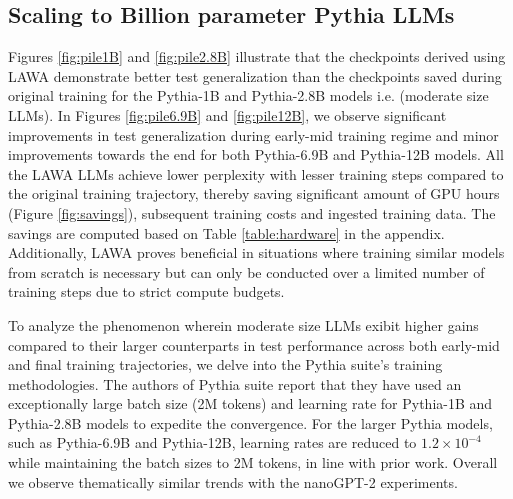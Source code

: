 \documentclass{article}
\newcommand{\method}{LAWA}
\begin{document}
\subsection{Scaling to Billion parameter Pythia LLMs}  \label{sec:result-1}

Figures \ref{fig:pile1B} and \ref{fig:pile2.8B} illustrate that the checkpoints derived using \method{} demonstrate better test generalization than the checkpoints saved during original training for the Pythia-1B and Pythia-2.8B models i.e. (moderate size LLMs). In Figures \ref{fig:pile6.9B} and \ref{fig:pile12B}, we observe significant improvements in test generalization during early-mid training regime and minor improvements towards the end for both Pythia-6.9B and Pythia-12B models. All the LAWA LLMs achieve lower perplexity with lesser training steps compared to the original training trajectory, thereby saving significant amount of GPU hours (Figure \ref{fig:savings}), subsequent training costs and ingested training data. The savings are computed based on Table \ref{table:hardware} in the appendix. Additionally, \method{} proves beneficial in situations where training similar models from scratch is necessary but can only be conducted over a limited number of training steps due to strict compute budgets.

To analyze the phenomenon wherein moderate size LLMs exibit higher gains compared to their larger counterparts in test performance across both early-mid and final training trajectories, we delve into the Pythia suite's training methodologies. The authors of Pythia suite \citep{biderman2023pythia} report that they have used an exceptionally large batch size (2M tokens) and learning rate for Pythia-1B and Pythia-2.8B models to expedite the convergence. For the larger Pythia models, such as Pythia-6.9B and Pythia-12B, learning rates are reduced to $1.2 \times 10^{-4}$ while maintaining the batch sizes to 2M tokens, in line with prior work. Overall we observe thematically similar trends with the nanoGPT-2 experiments.
\end{document}
